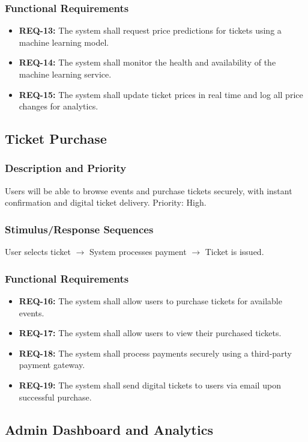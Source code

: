 \documentclass[11pt,a4paper]{article}
\begin{document}
\subsubsection{Functional Requirements}
\begin{itemize}
    \item \textbf{REQ-13:} The system shall request price predictions for tickets using a machine learning model.
    \item \textbf{REQ-14:} The system shall monitor the health and availability of the machine learning service.
    \item \textbf{REQ-15:} The system shall update ticket prices in real time and log all price changes for analytics.
\end{itemize}

\subsection{Ticket Purchase}
\subsubsection{Description and Priority}
Users will be able to browse events and purchase tickets securely, with instant confirmation and digital ticket delivery. Priority: High.
\subsubsection{Stimulus/Response Sequences}
User selects ticket $\rightarrow$ System processes payment $\rightarrow$ Ticket is issued.
\subsubsection{Functional Requirements}
\begin{itemize}
    \item \textbf{REQ-16:} The system shall allow users to purchase tickets for available events.
    \item \textbf{REQ-17:} The system shall allow users to view their purchased tickets.
    \item \textbf{REQ-18:} The system shall process payments securely using a third-party payment gateway.
    \item \textbf{REQ-19:} The system shall send digital tickets to users via email upon successful purchase.
\end{itemize}

\subsection{Admin Dashboard and Analytics}
\end{document}
